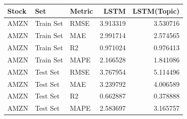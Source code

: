 \begin{tabular}{lllrr}
\toprule
Stock & Set & Metric & LSTM & LSTM(Topic) \\
\midrule
AMZN & Train Set & RMSE & 3.913319 & 3.530716 \\
AMZN & Train Set & MAE & 2.991714 & 2.574565 \\
AMZN & Train Set & R2 & 0.971024 & 0.976413 \\
AMZN & Train Set & MAPE & 2.166528 & 1.841086 \\
AMZN & Test Set & RMSE & 3.767954 & 5.114496 \\
AMZN & Test Set & MAE & 3.239792 & 4.006589 \\
AMZN & Test Set & R2 & 0.662887 & 0.378888 \\
AMZN & Test Set & MAPE & 2.583697 & 3.165757 \\
\bottomrule
\end{tabular}
